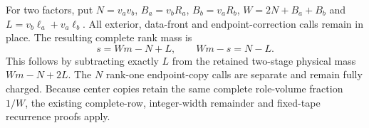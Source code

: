 For two factors, put $N=v_av_b$, $B_a=v_bR_a$, $B_b=v_aR_b$,
$W=2N+B_a+B_b$ and $L=v_b\ell_a+v_a\ell_b$.
All exterior, data-front and endpoint-correction calls remain in place.
The resulting complete rank mass is
\[
 s=Wm-N+L,\qquad Wm-s=N-L.
\]
This follows by subtracting exactly $L$ from the retained two-stage
physical mass $Wm-N+2L$. The $N$ rank-one endpoint-copy calls are
separate and remain fully charged. Because center copies retain the
same complete role-volume fraction $1/W$, the existing complete-row,
integer-width remainder and fixed-tape recurrence proofs apply.
